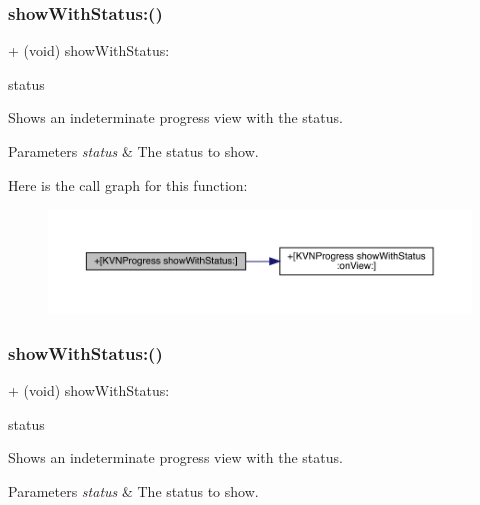 \subsubsection{\texorpdfstring{show\+With\+Status\+:()}{showWithStatus:()}\hspace{0.1cm}{\footnotesize\ttfamily [1/3]}}
{\footnotesize\ttfamily + (void) show\+With\+Status\+: \begin{DoxyParamCaption}\item[{(N\+S\+String $\ast$)}]{status }\end{DoxyParamCaption}}

Shows an indeterminate progress view with the {\ttfamily status}. 
\begin{DoxyParams}{Parameters}
{\em status} & The status to show. \\
\hline
\end{DoxyParams}
Here is the call graph for this function\+:\nopagebreak
\begin{figure}[H]
\begin{center}
\leavevmode
\includegraphics[width=350pt]{interface_k_v_n_progress_af86acbff98a05f0ee39e746628b02022_cgraph}
\end{center}
\end{figure}
\mbox{\label{interface_k_v_n_progress_af86acbff98a05f0ee39e746628b02022}} 
\subsubsection{\texorpdfstring{show\+With\+Status\+:()}{showWithStatus:()}\hspace{0.1cm}{\footnotesize\ttfamily [2/3]}}
{\footnotesize\ttfamily + (void) show\+With\+Status\+: \begin{DoxyParamCaption}\item[{(N\+S\+String $\ast$)}]{status }\end{DoxyParamCaption}}

Shows an indeterminate progress view with the {\ttfamily status}. 
\begin{DoxyParams}{Parameters}
{\em status} & The status to show. \\
\hline
\end{DoxyParams}
\mbox{\label{interface_k_v_n_progress_af86acbff98a05f0ee39e746628b02022}} 
